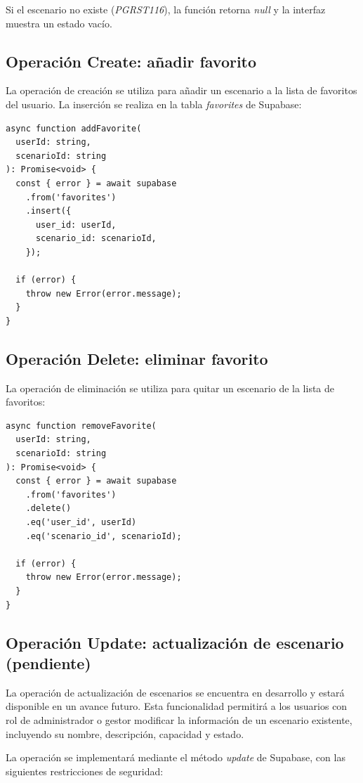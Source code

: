 Si el escenario no existe (\textit{PGRST116}), la funci\'on retorna
\textit{null} y la interfaz muestra un estado vac\'io.

\subsection{Operaci\'on Create: a\~nadir favorito}

La operaci\'on de creaci\'on se utiliza para a\~nadir un escenario a la
lista de favoritos del usuario. La inserci\'on se realiza en la tabla
\textit{favorites} de Supabase:

\begin{lstlisting}
async function addFavorite(
  userId: string,
  scenarioId: string
): Promise<void> {
  const { error } = await supabase
    .from('favorites')
    .insert({
      user_id: userId,
      scenario_id: scenarioId,
    });

  if (error) {
    throw new Error(error.message);
  }
}
\end{lstlisting}

\subsection{Operaci\'on Delete: eliminar favorito}

La operaci\'on de eliminaci\'on se utiliza para quitar un escenario de
la lista de favoritos:

\begin{lstlisting}
async function removeFavorite(
  userId: string,
  scenarioId: string
): Promise<void> {
  const { error } = await supabase
    .from('favorites')
    .delete()
    .eq('user_id', userId)
    .eq('scenario_id', scenarioId);

  if (error) {
    throw new Error(error.message);
  }
}
\end{lstlisting}

\subsection{Operaci\'on Update: actualizaci\'on de escenario (pendiente)}

La operaci\'on de actualizaci\'on de escenarios se encuentra en
desarrollo y estar\'a disponible en un avance futuro. Esta
funcionalidad permitir\'a a los usuarios con rol de administrador o
gestor modificar la informaci\'on de un escenario existente, incluyendo
su nombre, descripci\'on, capacidad y estado.

La operaci\'on se implementar\'a mediante el m\'etodo \textit{update} de
Supabase, con las siguientes restricciones de seguridad:

